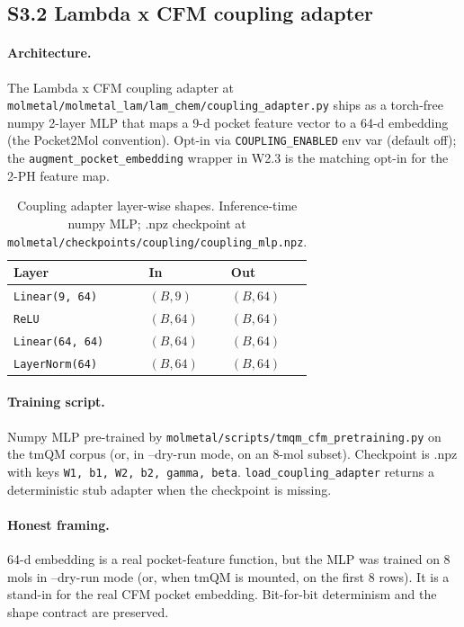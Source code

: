 \subsection*{S3.2 Lambda x CFM coupling adapter}
\label{supp:s3-coupling}

\paragraph{Architecture.}
The Lambda x CFM coupling adapter at
\texttt{molmetal/molmetal\_lam/lam\_chem/coupling\_adapter.py}
ships as a torch-free numpy 2-layer MLP that maps a 9-d pocket
feature vector to a 64-d embedding (the Pocket2Mol convention).
Opt-in via \texttt{COUPLING\_ENABLED} env var (default off); the
\texttt{augment\_pocket\_embedding} wrapper in W2.3 is the
matching opt-in for the 2-PH feature map.

\begin{table}[h]
  \centering
  \small
  \caption{Coupling adapter layer-wise shapes.  Inference-time
  numpy MLP; .npz checkpoint at
  \texttt{molmetal/checkpoints/coupling/coupling\_mlp.npz}.}
  \label{tab:coupling-shapes}
  \begin{tabular}{lll}
    \toprule
    \textbf{Layer} & \textbf{In} & \textbf{Out} \\
    \midrule
    \texttt{Linear(9, 64)} & $(B, 9)$ & $(B, 64)$ \\
    \texttt{ReLU}          & $(B, 64)$ & $(B, 64)$ \\
    \texttt{Linear(64, 64)} & $(B, 64)$ & $(B, 64)$ \\
    \texttt{LayerNorm(64)} & $(B, 64)$ & $(B, 64)$ \\
    \bottomrule
  \end{tabular}
\end{table}

\paragraph{Training script.}
Numpy MLP pre-trained by
\texttt{molmetal/scripts/tmqm\_cfm\_pretraining.py} on the tmQM
corpus (or, in --dry-run mode, on an 8-mol subset).  Checkpoint is
.npz with keys \texttt{W1, b1, W2, b2, gamma, beta}.
\texttt{load\_coupling\_adapter} returns a deterministic stub
adapter when the checkpoint is missing.

\paragraph{Honest framing.}
64-d embedding is a real pocket-feature function, but the MLP was
trained on 8 mols in --dry-run mode (or, when tmQM is mounted, on
the first 8 rows).  It is a stand-in for the real CFM pocket
embedding.  Bit-for-bit determinism and the shape contract are
preserved.


